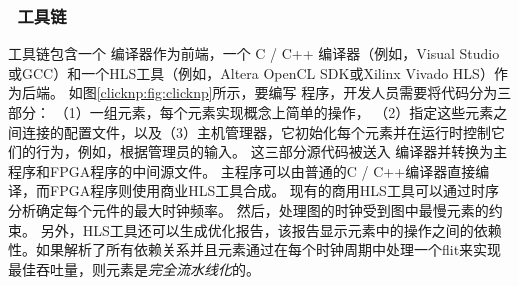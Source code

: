 \subsubsection{\name\ 工具链}
\label{clicknp:subsec:toolchain}
\name 工具链包含一个 \name 编译器作为前端，一个 C / C++ 编译器（例如，Visual Studio或GCC）和一个HLS工具（例如，Altera OpenCL SDK或Xilinx Vivado HLS）作为后端。
如图\ref{clicknp:fig:clicknp}所示，要编写 \name 程序，开发人员需要将代码分为三部分：
（1）一组元素，每个元素实现概念上简单的操作，
（2）指定这些元素之间连接的配置文件，以及（3）主机管理器，它初始化每个元素并在运行时控制它们的行为，例如，根据管理员的输入。
这三部分源代码被送入 \name 编译器并转换为主程序和FPGA程序的中间源文件。
主程序可以由普通的C / C++编译器直接编译，而FPGA程序则使用商业HLS工具合成。
现有的商用HLS工具可以通过时序分析确定每个元件的最大时钟频率。
然后，\name 处理图的时钟受到图中最慢元素的约束。
另外，HLS工具还可以生成优化报告，该报告显示元素中的操作之间的依赖性。如果解析了所有依赖关系并且元素通过在每个时钟周期中处理一个flit来实现最佳吞吐量，则元素是\textit {完全流水线化}的。
